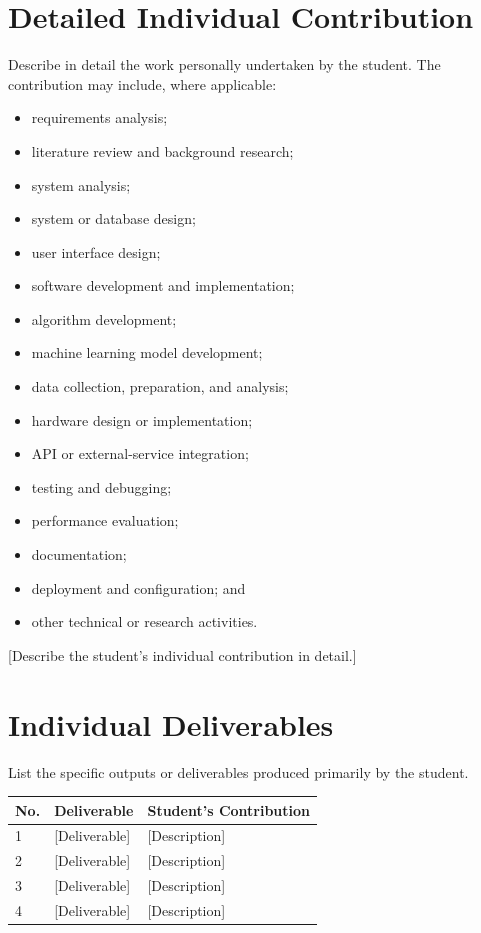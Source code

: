 \documentclass[12pt,a4paper]{report}
\begin{document}
\section{Detailed Individual Contribution}

Describe in detail the work personally undertaken by the student. The contribution may include, where applicable:

\begin{itemize}
    \item requirements analysis;
    \item literature review and background research;
    \item system analysis;
    \item system or database design;
    \item user interface design;
    \item software development and implementation;
    \item algorithm development;
    \item machine learning model development;
    \item data collection, preparation, and analysis;
    \item hardware design or implementation;
    \item API or external-service integration;
    \item testing and debugging;
    \item performance evaluation;
    \item documentation;
    \item deployment and configuration; and
    \item other technical or research activities.
\end{itemize}

[Describe the student's individual contribution in detail.]

\section{Individual Deliverables}

List the specific outputs or deliverables produced primarily by the student.

\begin{table}[H]
\centering
\begin{tabular}{p{}p{}p{}}
\toprule
\textbf{No.} & \textbf{Deliverable} & \textbf{Student's Contribution} \\
\midrule
1 & [Deliverable] & [Description] \\
2 & [Deliverable] & [Description] \\
3 & [Deliverable] & [Description] \\
4 & [Deliverable] & [Description] \\
\bottomrule
\end{tabular}
\end{table}
\end{document}

